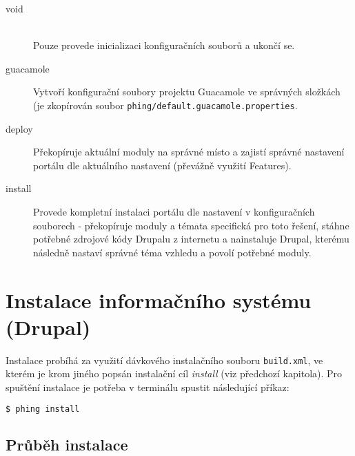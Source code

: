 \begin{description}
  \item[void] \hfill \\
  Pouze provede inicializaci konfiguračních souborů a ukončí se.  
  \item[guacamole] 
  Vytvoří konfigurační soubory projektu Guacamole ve správných složkách (je zkopírován soubor \texttt{phing/default.guacamole.properties}.
  \item[deploy]
  Překopíruje aktuální moduly na správné místo a zajistí správné nastavení portálu dle aktuálního nastavení (převážně využití Features).
  \item[install]
  Provede kompletní instalaci portálu dle nastavení v konfiguračních souborech - překopíruje moduly a témata specifická pro toto řešení, stáhne potřebné zdrojové kódy Drupalu z internetu a nainstaluje Drupal, kterému následně nastaví správné téma vzhledu a povolí potřebné moduly.
\end{description}

\section{Instalace informačního systému (Drupal)}
Instalace probíhá za využití dávkového instalačního souboru \texttt{build.xml}, ve kterém je krom jiného popsán instalační cíl \emph{install} (viz předchozí kapitola). Pro spuštění instalace je potřeba v terminálu spustit následující příkaz:

\begin{lstlisting}[language=bash]
  $ phing install
\end{lstlisting}

\subsection*{Průběh instalace}

